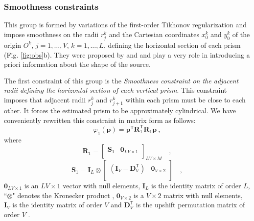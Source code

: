 \subsubsection{Smoothness constraints}

This group is formed by variations of the first-order Tikhonov regularization \citep[][ p. 103]{aster-etal2019}
and impose smoothness on the radii $r_{j}^{k}$ and the Cartesian coordinates $x_{0}^{k}$ and $y_{0}^{k}$ of the origin 
$O^{k}$, $j = 1, \dots, V$, $k = 1, \dots, L$, defining the horizontal section of each prism (Fig. \ref{fig:obs}b).
They were proposed by \citet{oliveirajr-etal2011} and \citet{oliveirajr-barbosa2013} and play a very 
role in introducing a priori information about the shape of the source. 

The first constraint of this group is the \textit{Smoothness constraint on the adjacent radii defining the horizontal 
section of each vertical prism}. This constraint imposes that adjacent radii $r_{j}^{k}$ and $r_{j+1}^{k}$ within each 
prism must be close to each other. It forces the estimated prism to be approximately cylindrical. 
We have conveniently rewritten this constraint in matrix form as follows:
\begin{equation}
\varphi_{1}(\mathbf{p}) = \mathbf{p}^{\mathsf{T}} \mathbf{R}^{\mathsf{T}}_{1}\mathbf{R}_{1} \mathbf{p} \: ,
\label{eq:phi1}
\end{equation}
where 
\begin{equation}
\mathbf{R}_{1} = \begin{bmatrix} 
\mathbf{S}_{1} & \mathbf{0}_{LV \times 1} \\
\end{bmatrix}_{LV \times M} \quad ,
\label{eq:R1-matrix}
\end{equation}
\begin{equation}
\mathbf{S}_{1} = 
\mathbf{I}_{L} \otimes 
\begin{bmatrix}
\left( \mathbf{I}_{V} - \mathbf{D}_{V}^\mathsf{T} \right) & \mathbf{0}_{V \times 2} \\
\end{bmatrix} \quad ,
\label{eq:S1-matrix}
\end{equation}
$\mathbf{0}_{LV \times 1}$ is an $LV \times 1$ vector with null elements, 
$\mathbf{I}_{L}$ is the identity matrix of order $L$, ``$\otimes$" denotes the Kronecker product 
\citep[][ p. 243]{horn_johnson1991}, $\mathbf{0}_{V \times 2}$ is a $V \times 2$ matrix with null elements, 
$\mathbf{I}_{V}$ is the identity matrix of order $V$ and $\mathbf{D}_{V}^\mathsf{T}$ is the upshift permutation 
matrix of order $V$ \citep[][ p. 20]{golub-vanloan2013}.

